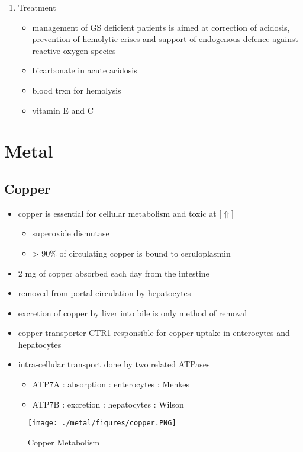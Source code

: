 \documentclass{scrartcl}
\begin{document}
\begin{enumerate}
\item Treatment
\label{sec:org5742364}
\begin{itemize}
\item management of GS deficient patients is aimed at correction of
acidosis, prevention of hemolytic crises and support of endogenous
defence against reactive oxygen species
\item bicarbonate in acute acidosis
\item blood trxn for hemolysis
\item vitamin E and C
\end{itemize}
\end{enumerate}
\section{Metal}
\label{sec:org57bc472}
\subsection{Copper}
\label{sec:org5593359}
\begin{itemize}
\item copper is essential for cellular metabolism and toxic at [\(\Uparrow\)]
\begin{itemize}
\item superoxide dismutase
\item > 90\% of circulating copper is bound to ceruloplasmin
\end{itemize}
\item 2 mg of copper absorbed each day from the intestine
\item removed from portal circulation by hepatocytes
\item excretion of copper by liver into bile is only method of removal
\item copper transporter CTR1 responsible for copper uptake in enterocytes and hepatocytes
\item intra-cellular transport done by two related ATPases
\begin{itemize}
\item ATP7A : absorption : enterocytes : Menkes
\item ATP7B : excretion : hepatocytes : Wilson
\end{itemize}
\end{itemize}

\begin{figure}[htbp]
\centering
\texttt{[image: ./metal/figures/copper.PNG]}
\caption[copper]{\label{fig:orgf740670}
Copper Metabolism}
\end{figure}
\end{document}

